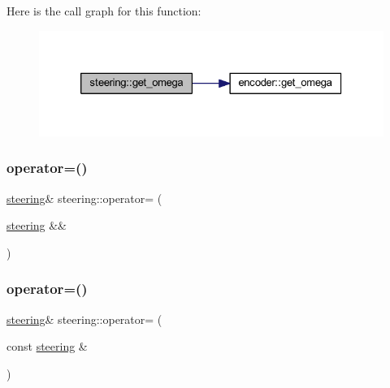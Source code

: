 Here is the call graph for this function\+:
\nopagebreak
\begin{figure}[H]
\begin{center}
\leavevmode
\includegraphics[width=326pt]{classsteering_a925978d3d3c42042b56d52a2dc049371_cgraph}
\end{center}
\end{figure}
\mbox{\label{classsteering_aab3b80efec6ef14734213ec15c228543}} 
\subsubsection{\texorpdfstring{operator=()}{operator=()}\hspace{0.1cm}{\footnotesize\ttfamily [1/2]}}
{\footnotesize\ttfamily \mbox{\hyperlink{classsteering}{steering}}\& steering\+::operator= (\begin{DoxyParamCaption}\item[{\mbox{\hyperlink{classsteering}{steering}} \&\&}]{ }\end{DoxyParamCaption})\hspace{0.3cm}{\ttfamily [default]}}

\mbox{\label{classsteering_ab6e1570939ecfb89acb3905efe6cb334}} 
\subsubsection{\texorpdfstring{operator=()}{operator=()}\hspace{0.1cm}{\footnotesize\ttfamily [2/2]}}
{\footnotesize\ttfamily \mbox{\hyperlink{classsteering}{steering}}\& steering\+::operator= (\begin{DoxyParamCaption}\item[{const \mbox{\hyperlink{classsteering}{steering}} \&}]{ }\end{DoxyParamCaption})\hspace{0.3cm}{\ttfamily [default]}}

